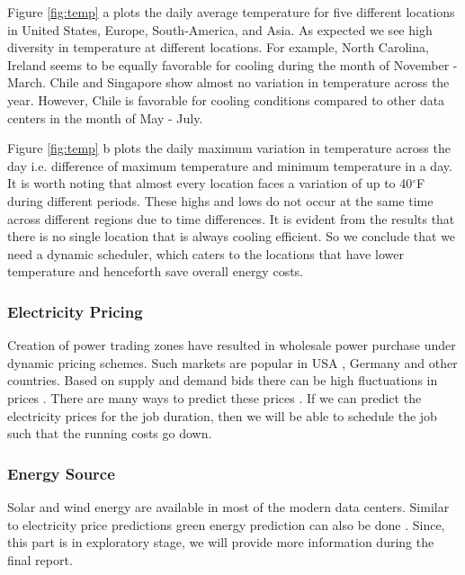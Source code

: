 \documentclass[letterpaper,twocolumn,10pt]{article}
\begin{document}
Figure \ref{fig:temp} a plots the daily average temperature for five different locations in United States, Europe, South-America, and Asia. As expected we see high diversity in temperature at different locations. For example, North Carolina, Ireland seems to be equally favorable for cooling during the month of November {-} March. Chile and Singapore show almost no variation in temperature across the year. However, Chile is favorable for cooling conditions compared to other data centers in the month of May {-} July. 

Figure \ref{fig:temp} b plots the daily maximum variation in temperature across the day i.e. difference of maximum temperature and minimum temperature in a day.  It is worth noting that almost every location faces a variation of up to 40$^{\circ}$F during different periods. These highs and lows do not occur at the same time across different regions due to time differences. It is evident from the results that there is no single location that is always cooling efficient. So we conclude that we need a dynamic scheduler, which caters to the locations that have lower temperature and henceforth save overall energy costs.

\subsubsection{Electricity Pricing} \label{sec:elec}
Creation of power trading zones have resulted in wholesale power purchase under dynamic pricing schemes. Such markets are popular in USA \cite{elecusa}, Germany \cite{elecgermany} and other countries. Based on supply and demand bids there can be high fluctuations in prices \cite{benini2002day}. There are many ways to predict these prices \cite{contreras2003arima} \cite{garcia2005garch}. If we can predict the electricity prices for the job duration, then we will be able to schedule the job such that the running costs go down.

\subsubsection{Energy Source} \label{sec:green}
Solar and wind energy are available in most of the modern data centers. Similar to electricity price predictions green energy prediction can also be done \cite{goiri2012greenhadoop} \cite{aksanli2012utilizing}. Since, this part is in exploratory stage, we will provide more information during the final report.
\end{document}
